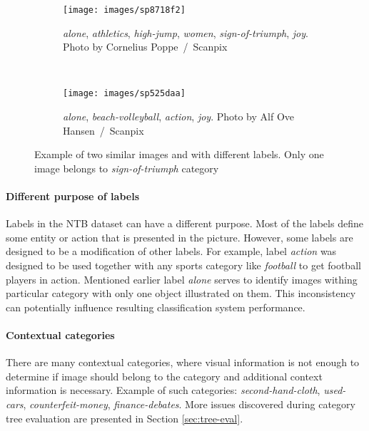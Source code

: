 \begin{figure}[ht]
    \centering
    \begin{subfigure}[a]{0.3\textwidth}
        \texttt{[image: images/sp8718f2]}
        \caption{\textit{alone}, \textit{athletics}, \textit{high-jump}, \textit{women}, \textit{sign-of-triumph}, \textit{joy}. Photo by Cornelius Poppe~/~Scanpix}
        \label{fig:with-sign-of-triumph}
    \end{subfigure}
    ~
    \begin{subfigure}[a]{0.3\textwidth}
        \texttt{[image: images/sp525daa]}
        \caption{\textit{alone}, \textit{beach-volleyball}, \textit{action}, \textit{joy}. Photo by Alf Ove Hansen~/~Scanpix}
        \label{fig:without-sign-of-triumph}
    \end{subfigure}
    \caption[Example of two similar images and with different labels]{Example of two similar images and with different labels. Only one image belongs to \textit{sign-of-triumph} category}
    \label{fig:sign-of-triumph-example}
\end{figure}

\paragraph{Different purpose of labels}
Labels in the NTB dataset can have a different purpose. Most of the labels define some entity or action that is presented in the picture. However, some labels are designed to be a modification of other labels. For example, label \textit{action} was designed to be used together with any sports category like \textit{football} to get football players in action. Mentioned earlier label \textit{alone} serves to identify images withing particular category with only one object illustrated on them. This inconsistency can potentially influence resulting classification system performance.

\paragraph{Contextual categories}
There are many contextual categories, where visual information is not enough to determine if image should belong to the category and additional context information is necessary. Example of such categories: \textit{second-hand-cloth}, \textit{used-cars}, \textit{counterfeit-money}, \textit{finance-debates}. More issues discovered during category tree evaluation are presented in Section \ref{sec:tree-eval}.


